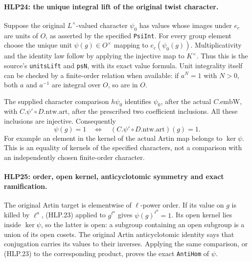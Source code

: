 \paragraph{HLP24: the unique integral lift of the original twist character.}
\label{claim:HLP24}
Suppose the original \(L^\times\)-valued character \(\psi_0\)
has values whose images under \(e_c\) are units of \(O\), as
asserted by the specified \texttt{Psi\allowbreak Int}. For every group element
choose the unique unit \(\psi(g)\in O^\times\) mapping to
\(e_c(\psi_0(g))\). Multiplicativity and the identity law follow
by applying the injective map to \(K^\times\). Thus this is the
source's \texttt{units\allowbreak Lift} and \texttt{ps\allowbreak N}, with its exact value
formula. Unit integrality itself can be checked by a finite-order
relation when available: if \(a^N=1\) with \(N>0\), both \(a\) and \(a^{-1}\)
are integral over \(O\), so are in \(O\).

The supplied character comparison \(h\psi_0\) identifies
\(\psi_0\), after the actual \(C.\mathrm{embW}\), with
\(C.\psi'\circ D.\mathrm{ntw.art}\), after the prescribed two
coefficient inclusions. All these inclusions are injective.
Consequently
\[
    \psi(g)=1
       \quad\Longleftrightarrow\quad
        (C.\psi'\circ D.\mathrm{ntw.art})(g)=1.       \tag{HLP.23}
\]
For example an element in the kernel of the actual Artin map
belongs to \(\ker\psi\). This is an equality of kernels of the
specified characters, not a comparison with an independently
chosen finite-order character.

\paragraph{HLP25: order, open kernel, anticyclotomic symmetry and exact ramification.}
\label{claim:HLP25}
The original Artin target is elementwise of \(\ell\)-power order.
If its value on \(g\) is killed by \(\ell^a\), (HLP.23) applied
to \(g^{\ell^a}\) gives \(\psi(g)^{\ell^a}=1\).
Its open kernel lies inside \(\ker\psi\), so the latter is open:
a subgroup containing an open subgroup is a union of its open
cosets. The original Artin anticyclotomic identity says that
conjugation carries its values to their inverses. Applying the
same comparison, or (HLP.23) to the corresponding product, proves
the exact \texttt{Anti\allowbreak Hom} of \(\psi\).

